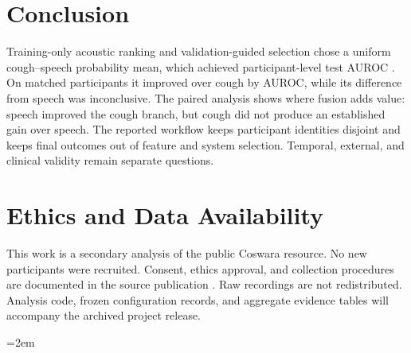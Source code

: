 \documentclass[conference]{IEEEtran}
\begin{document}
\section{Conclusion}

Training-only acoustic ranking and validation-guided selection chose a uniform
cough--speech probability mean, which achieved participant-level test AUROC
\FusionTestAUROC{}. On matched participants it improved over cough by
\FusionMinusCoughAUROC{} AUROC, while its \FusionMinusSpeechAUROC{} difference
from speech was inconclusive. The paired analysis shows where fusion adds value:
speech improved the cough branch, but cough did not produce an established gain
over speech. The reported workflow keeps participant identities disjoint and
keeps final outcomes out of feature and system selection. Temporal, external,
and clinical validity remain separate questions.

\section*{Ethics and Data Availability}

This work is a secondary analysis of the public Coswara resource. No new
participants were recruited. Consent, ethics approval, and collection procedures
are documented in the source publication \cite{bhattacharya2023coswara}. Raw
recordings are not redistributed. Analysis code, frozen configuration records,
and aggregate evidence tables will accompany the archived project release.

\emergencystretch=2em
\begingroup
\sloppy


\endgroup
\end{document}
